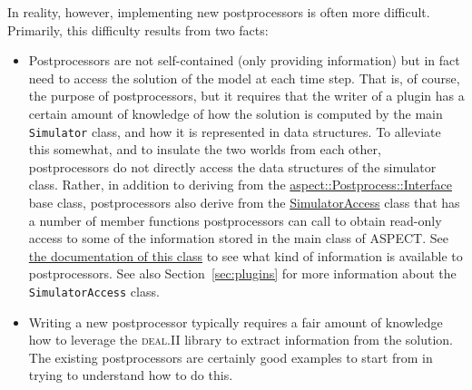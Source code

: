 \documentclass{article}
\newcommand{\dealii}{{\textsc{deal.II}}}
\newcommand{\aspect}{\textsc{ASPECT}}
\begin{document}
In reality, however, implementing new postprocessors is often more
difficult. Primarily, this difficulty results from two facts:
\begin{itemize}
\item Postprocessors are not self-contained (only providing information) but
  in fact need to access the solution of the model at each time step. That is,
  of course, the purpose of postprocessors, but it requires that the writer of
  a plugin has a certain amount of knowledge of how the solution is computed
  by the main \texttt{Simulator} class, and how it is represented in data
  structures. To alleviate this somewhat, and to insulate the two worlds from
  each other, postprocessors do not directly access the data structures of the
  simulator class. Rather, in addition to deriving from the
  \href{doc/doxygen/classaspect_1_1Postprocess_1_1Interface.html}{aspect::Postprocess::Interface}
  base class, postprocessors also
  derive from the \href{doc/doxygen/classaspect_1_1SimulatorAccess.html}{SimulatorAccess} class that
  has a number of member functions postprocessors can call to obtain read-only
  access to some of the information stored in the main class of \aspect{}. See
  \href{doc/doxygen/classaspect_1_1SimulatorAccess.html}{the
    documentation of this class} to see what kind of information is available to
  postprocessors. See also Section~\ref{sec:plugins} for more information
  about the \texttt{SimulatorAccess} class.

\item Writing a new postprocessor typically
  requires a fair amount of knowledge how to leverage the \dealii{} library to
  extract information from the solution. The existing postprocessors are
  certainly good examples to start from in trying to understand how to do this.
\end{itemize}
\end{document}
